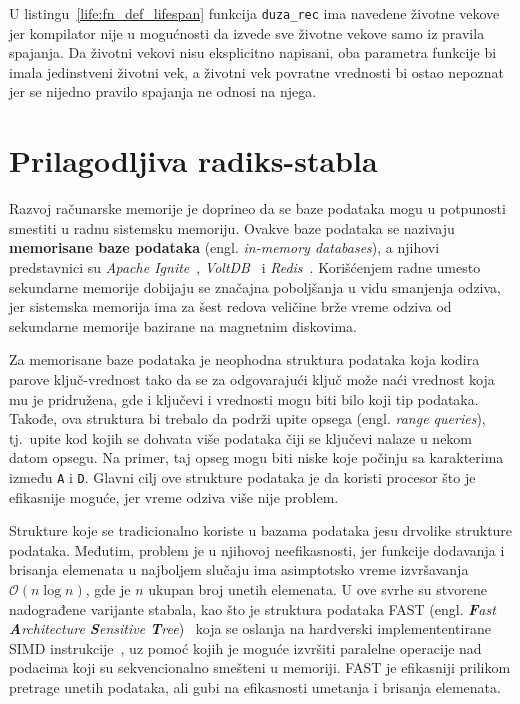 \documentclass[12pt,oneside]{memoir}
\begin{document}
U listingu~\ref{life:fn_def_lifespan} funkcija \texttt{duza\_rec} ima navedene životne
vekove jer kompilator nije u mogućnosti da izvede sve životne vekove samo iz
pravila spajanja. Da životni vekovi nisu eksplicitno napisani, oba parametra funkcije
bi imala jedinstveni životni vek, a životni vek povratne vrednosti bi ostao nepoznat
jer se nijedno pravilo spajanja ne odnosi na njega.


\chapter{Prilagodljiva radiks-stabla}

Razvoj računarske memorije je doprineo da se baze podataka
mogu u potpunosti smestiti u radnu sistemsku memoriju. Ovakve baze podataka se nazivaju
\textbf{memorisane baze podataka} (engl. \emph{in-memory databases}), a njihovi predstavnici su
\emph{Apache Ignite}~\cite{apacheIgnite}, \emph{VoltDB}~\cite{voltDB} i
\emph{Redis}~\cite{redis}. Korišćenjem radne umesto sekundarne
memorije dobijaju se značajna poboljšanja u vidu smanjenja odziva, jer sistemska memorija
ima za šest redova veličine brže vreme odziva
od sekundarne memorije bazirane na magnetnim diskovima.

Za memorisane baze podataka je neophodna struktura podataka koja kodira parove
ključ-vrednost tako da se za odgovarajući ključ može naći vrednost koja mu
je pridružena, gde i ključevi i vrednosti mogu biti bilo koji tip podataka.
Takođe, ova struktura bi trebalo da podrži upite opsega
(engl. \emph{range queries}), tj.\ upite kod kojih se dohvata više podataka
čiji se ključevi nalaze u nekom datom opsegu.
Na primer, taj opseg mogu biti niske koje počinju sa karakterima između
\texttt{A} i \texttt{D}.
Glavni cilj ove strukture podataka je da koristi procesor što je efikasnije moguće, jer
vreme odziva više nije problem.

Strukture koje se tradicionalno koriste u bazama podataka jesu
drvolike strukture podataka. Međutim, problem je u njihovoj neefikasnosti, jer
funkcije dodavanja i brisanja elemenata u najboljem slučaju ima asimptotsko vreme izvršavanja
$ \mathcal{O}(n\log{}n) $, gde je $n$ ukupan broj unetih elemenata.
U ove svrhe su stvorene nadograđene varijante stabala,
kao što je struktura podataka FAST
(engl. \emph{\textbf{F}ast \textbf{A}rchitecture \textbf{S}ensitive \textbf{T}ree})~\cite{fast}
koja se oslanja na hardverski implemententirane SIMD instrukcije~\cite{simd},
uz pomoć kojih je moguće izvršiti paralelne operacije nad podacima koji su
sekvencionalno smešteni u memoriji.
FAST je efikasniji prilikom pretrage unetih podataka,
ali gubi na efikasnosti umetanja i brisanja elemenata.
\end{document}
